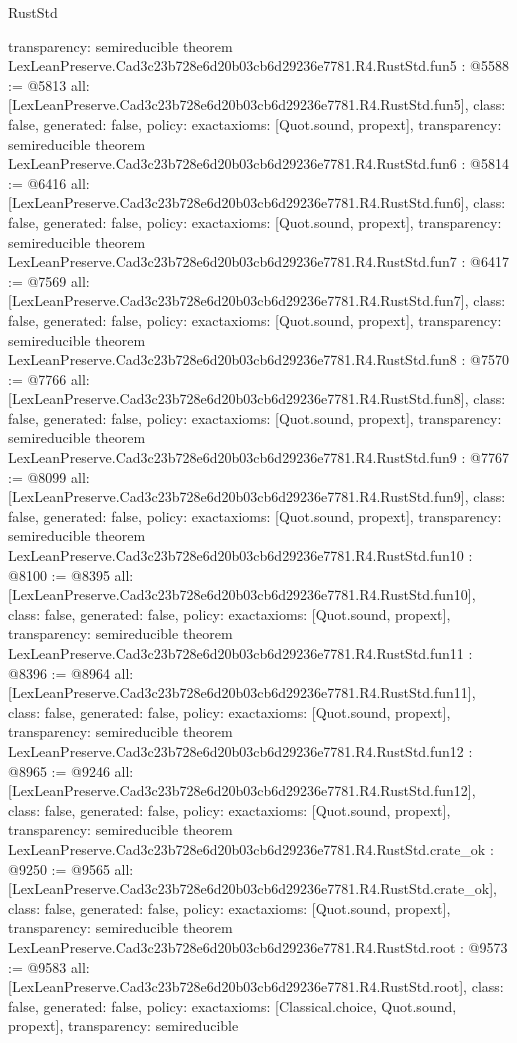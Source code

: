 \begin{lexlean}{RustStd}
\begin{coremodule}
{  transparency: semireducible
}
theorem LexLeanPreserve.Cad3c23b728e6d20b03cb6d29236e7781.R4.RustStd.fun5 : @5588 := @5813 {
  all: [LexLeanPreserve.Cad3c23b728e6d20b03cb6d29236e7781.R4.RustStd.fun5],
  class: false,
  generated: false,
  policy: exact{axioms: [Quot.sound, propext]},
  transparency: semireducible
}
theorem LexLeanPreserve.Cad3c23b728e6d20b03cb6d29236e7781.R4.RustStd.fun6 : @5814 := @6416 {
  all: [LexLeanPreserve.Cad3c23b728e6d20b03cb6d29236e7781.R4.RustStd.fun6],
  class: false,
  generated: false,
  policy: exact{axioms: [Quot.sound, propext]},
  transparency: semireducible
}
theorem LexLeanPreserve.Cad3c23b728e6d20b03cb6d29236e7781.R4.RustStd.fun7 : @6417 := @7569 {
  all: [LexLeanPreserve.Cad3c23b728e6d20b03cb6d29236e7781.R4.RustStd.fun7],
  class: false,
  generated: false,
  policy: exact{axioms: [Quot.sound, propext]},
  transparency: semireducible
}
theorem LexLeanPreserve.Cad3c23b728e6d20b03cb6d29236e7781.R4.RustStd.fun8 : @7570 := @7766 {
  all: [LexLeanPreserve.Cad3c23b728e6d20b03cb6d29236e7781.R4.RustStd.fun8],
  class: false,
  generated: false,
  policy: exact{axioms: [Quot.sound, propext]},
  transparency: semireducible
}
theorem LexLeanPreserve.Cad3c23b728e6d20b03cb6d29236e7781.R4.RustStd.fun9 : @7767 := @8099 {
  all: [LexLeanPreserve.Cad3c23b728e6d20b03cb6d29236e7781.R4.RustStd.fun9],
  class: false,
  generated: false,
  policy: exact{axioms: [Quot.sound, propext]},
  transparency: semireducible
}
theorem LexLeanPreserve.Cad3c23b728e6d20b03cb6d29236e7781.R4.RustStd.fun10 : @8100 := @8395 {
  all: [LexLeanPreserve.Cad3c23b728e6d20b03cb6d29236e7781.R4.RustStd.fun10],
  class: false,
  generated: false,
  policy: exact{axioms: [Quot.sound, propext]},
  transparency: semireducible
}
theorem LexLeanPreserve.Cad3c23b728e6d20b03cb6d29236e7781.R4.RustStd.fun11 : @8396 := @8964 {
  all: [LexLeanPreserve.Cad3c23b728e6d20b03cb6d29236e7781.R4.RustStd.fun11],
  class: false,
  generated: false,
  policy: exact{axioms: [Quot.sound, propext]},
  transparency: semireducible
}
theorem LexLeanPreserve.Cad3c23b728e6d20b03cb6d29236e7781.R4.RustStd.fun12 : @8965 := @9246 {
  all: [LexLeanPreserve.Cad3c23b728e6d20b03cb6d29236e7781.R4.RustStd.fun12],
  class: false,
  generated: false,
  policy: exact{axioms: [Quot.sound, propext]},
  transparency: semireducible
}
theorem LexLeanPreserve.Cad3c23b728e6d20b03cb6d29236e7781.R4.RustStd.crate_ok : @9250 := @9565 {
  all: [LexLeanPreserve.Cad3c23b728e6d20b03cb6d29236e7781.R4.RustStd.crate_ok],
  class: false,
  generated: false,
  policy: exact{axioms: [Quot.sound, propext]},
  transparency: semireducible
}
theorem LexLeanPreserve.Cad3c23b728e6d20b03cb6d29236e7781.R4.RustStd.root : @9573 := @9583 {
  all: [LexLeanPreserve.Cad3c23b728e6d20b03cb6d29236e7781.R4.RustStd.root],
  class: false,
  generated: false,
  policy: exact{axioms: [Classical.choice, Quot.sound, propext]},
  transparency: semireducible
}


\end{coremodule}
\end{lexlean}
